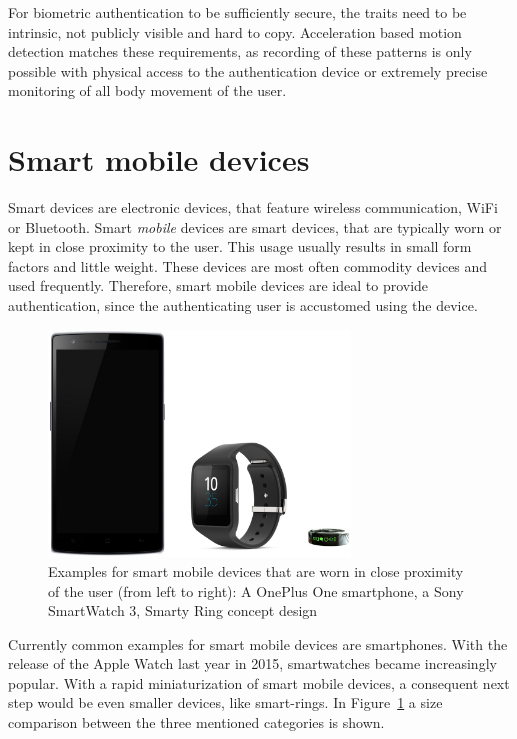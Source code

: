 For biometric authentication to be sufficiently secure, the traits need to be intrinsic, \ie not publicly visible and hard to copy. Acceleration based motion detection matches these requirements, as recording of these patterns is only possible with physical access to the authentication device or extremely precise monitoring of all body movement of the user.

\section{Smart mobile devices}
Smart devices are electronic devices, that feature wireless communication, \eg WiFi or Bluetooth. Smart \emph{mobile} devices are smart devices, that are typically worn or kept in close proximity to the user. This usage usually results in small form factors and little weight. These devices are most often commodity devices and used frequently. Therefore, smart mobile devices are ideal to provide authentication, since the authenticating user is accustomed using the device.

\begin{figure}
    \centering
    \includegraphics[width=0.7141\textwidth]{figures/SmartDevices.png}
    \caption{Examples for smart mobile devices that are worn in close proximity of the user (from left to right): A OnePlus One smartphone, a Sony SmartWatch 3, Smarty Ring concept design \cite{oneplusone, sonySW3, smartyRing}}
    \label{fig:smartdevices}
\end{figure}
Currently common examples for smart mobile devices are smartphones. With the release of the Apple Watch last year in 2015, smartwatches became increasingly popular. With a rapid miniaturization of smart mobile devices, a consequent next step would be even smaller devices, like smart-rings. In Figure~\ref{fig:smartdevices} a size comparison between the three mentioned categories is shown.

